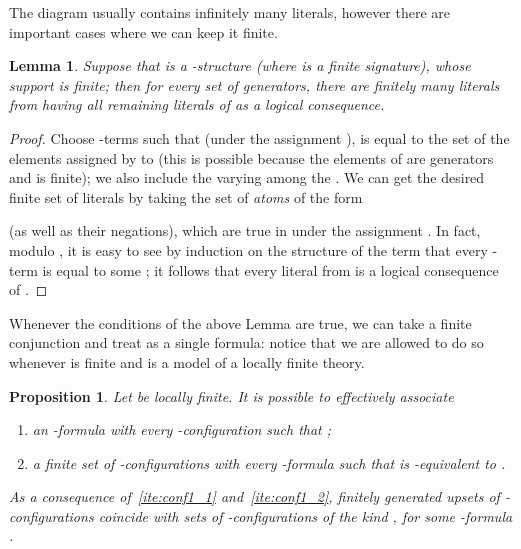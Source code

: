 \documentclass{LMCS}
\theoremstyle{plain}\newtheorem{assumption}[thm]{Assumption}
\theoremstyle{plain}\newtheorem{proposition}[thm]{Proposition}
\theoremstyle{plain}\newtheorem{property}[thm]{Property}
\theoremstyle{plain}\newtheorem{example}[thm]{Example}
\theoremstyle{plain}\newtheorem{claim}[thm]{Claim}
\theoremstyle{plain}\newtheorem{lemma}[thm]{Lemma}
\begin{document}
The diagram  usually contains infinitely many
literals, however there are important cases where we can keep it
finite.
\begin{lemma}
  Suppose that  is a -structure (where  is a
  finite signature), whose support  is finite; then for every set
   of generators, there are finitely many literals from
   having all remaining literals of 
  as a logical consequence.
\end{lemma}
\begin{proof} Choose -terms  such that (under the
  assignment ),  is equal to the set of the
  elements assigned by  to  (this is
  possible because the elements of  are generators and  is
  finite); we also include the  varying  among the . We can get the desired finite set  of literals by
  taking the set of \emph{atoms} of the form
  
  (as well as their negations), which are true in  under the
  assignment . In fact, modulo , it is easy to see by
  induction on
the structure of the term  that every -term  is
  equal to some ; it follows that every literal from
   is a logical consequence of .
\end{proof}
Whenever the conditions of the above Lemma are true, we can take a
finite conjunction and treat  as a single formula:
notice that we are allowed to do so whenever  is finite and 
is a model of a locally finite theory.
\begin{proposition}\label{prop:conf1}
Let  be locally finite.  It is possible to effectively associate
  \begin{enumerate}[{\rm (i)}]
  \item\label{ite:conf1_1} an -formula  with every
    -configuration  such that ;
  \item\label{ite:conf1_2} a finite set  of
    -configurations with every -formula  such
    that  is -equivalent to .
  \end{enumerate}
  As a consequence of~\eqref{ite:conf1_1} and~\eqref{ite:conf1_2},
  finitely generated upsets of -configurations coincide with
  sets of -con\-fi\-gu\-ra\-tions of the kind ,
  for some -formula .
\end{proposition}
\end{document}
